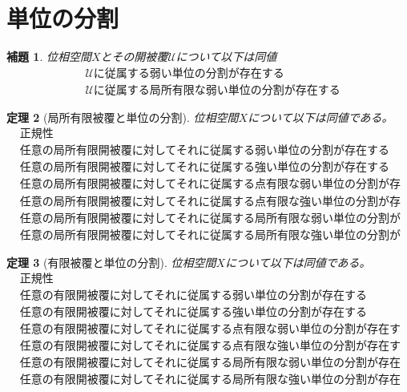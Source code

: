 \documentclass[leqno]{jsarticle}
\newtheorem{thm}{定理}
\newtheorem{lem}[thm]{補題}
\begin{document}
\section*{単位の分割}
\setcounter{equation}{0}
\begin{lem}
位相空間$X$とその開被覆$\mathcal{U}$について以下は同値
\begin{align}
&\mbox{$\mathcal{U}$に従属する弱い単位の分割が存在する}\\
&\mbox{$\mathcal{U}$に従属する局所有限な弱い単位の分割が存在する}
\end{align}
\end{lem}
\setcounter{equation}{0}
\begin{thm}[局所有限被覆と単位の分割]
位相空間$X$について以下は同値である。
\begin{align}
&\mbox{正規性}\\
&\mbox{任意の局所有限開被覆に対してそれに従属する弱い単位の分割が存在する}\\ 
&\mbox{任意の局所有限開被覆に対してそれに従属する強い単位の分割が存在する}\\ 
&\mbox{任意の局所有限開被覆に対してそれに従属する点有限な弱い単位の分割が存在する}\\ 
&\mbox{任意の局所有限開被覆に対してそれに従属する点有限な強い単位の分割が存在する}\\ 
&\mbox{任意の局所有限開被覆に対してそれに従属する局所有限な弱い単位の分割が存在する}\\ 
&\mbox{任意の局所有限開被覆に対してそれに従属する局所有限な強い単位の分割が存在する}
\end{align}
\end{thm}
\setcounter{equation}{0}
\begin{thm}[有限被覆と単位の分割]
位相空間$X$について以下は同値である。
\begin{align}
&\mbox{正規性}\\
&\mbox{任意の有限開被覆に対してそれに従属する弱い単位の分割が存在する}\\ 
&\mbox{任意の有限開被覆に対してそれに従属する強い単位の分割が存在する}\\ 
&\mbox{任意の有限開被覆に対してそれに従属する点有限な弱い単位の分割が存在する}\\ 
&\mbox{任意の有限開被覆に対してそれに従属する点有限な強い単位の分割が存在する}\\ 
&\mbox{任意の有限開被覆に対してそれに従属する局所有限な弱い単位の分割が存在する}\\ 
&\mbox{任意の有限開被覆に対してそれに従属する局所有限な強い単位の分割が存在する}
\end{align}
\end{thm}
\end{document}
